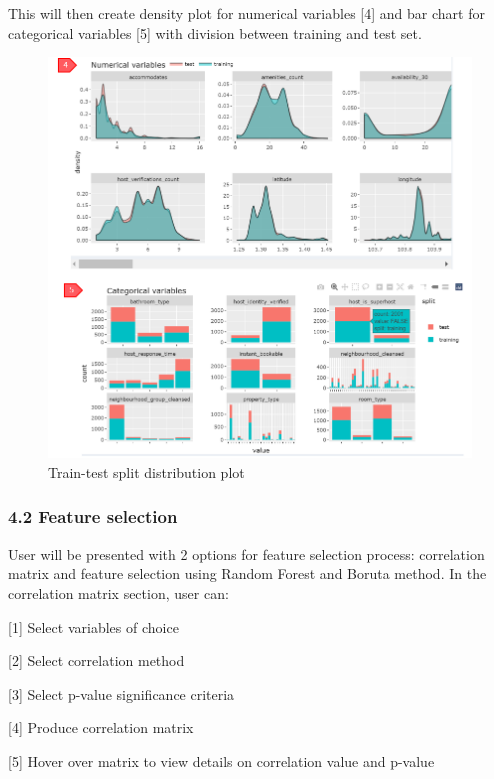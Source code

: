 \documentclass[
  12pt,
]{article}
\begin{document}
This will then create density plot for numerical variables {[}4{]} and
bar chart for categorical variables {[}5{]} with division between
training and test set.

\begin{figure}[H]

{\centering \includegraphics[width=0.95\linewidth]{images/datasplit2} 

}

\caption{Train-test split distribution plot}\label{fig:unnamed-chunk-19}
\end{figure}

\hypertarget{feature-selection}{%
\subsubsection{4.2 Feature selection}\label{feature-selection}}

User will be presented with 2 options for feature selection process:
correlation matrix and feature selection using Random Forest and Boruta
method. In the correlation matrix section, user can:

{[}1{]} Select variables of choice

{[}2{]} Select correlation method

{[}3{]} Select p-value significance criteria

{[}4{]} Produce correlation matrix

{[}5{]} Hover over matrix to view details on correlation value and
p-value
\end{document}
